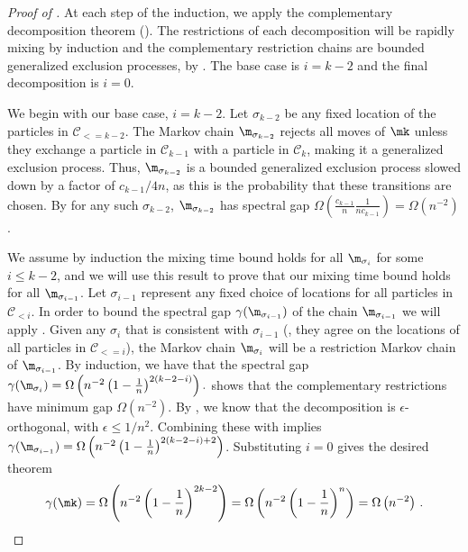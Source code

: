 \documentclass{toc}
\begin{document}
%
\begin{proof}[Proof of ]
At each step of the induction, we apply the complementary decomposition 
theorem (). The restrictions of each 
decomposition will be rapidly mixing by induction and the complementary 
restriction chains are bounded generalized exclusion processes, by 
.  The base case is $i=k-2$ and the final 
decomposition is $i=0$.
 
We begin with our base case, $i=k-2$.  
Let $\sigma_{k-2}$ be any fixed location of the particles in $\mathcal{C}_{<= k-2}.$ 
The Markov chain $\m_{\sigma_{k-2}}$ rejects all moves of $\mk$ unless 
they exchange a particle in $\mathcal{C}_{k-1}$ with a particle in 
$\mathcal{C}_{k}$,
making it a generalized exclusion process. Thus, 
$\m_{\sigma_{k-2}}$ is a bounded generalized exclusion process slowed 
down by a factor of $c_{k-1}/4n$, as this is the probability that 
these transitions are chosen.  By  for any 
such $\sigma_{k-2}$, $\m_{\sigma_{k-2}}$ has spectral gap 
$\Omega(\frac{c_{k-1}}{n}\frac{1}{n c_{k-1}})=\Omega(n^{-2})$. 

We assume by induction the mixing time bound holds for all 
$\m_{\sigma_i}$ for some $i\leq k-2$, and we will use this result to 
prove that our mixing time bound holds for all $\m_{\sigma_{i-1}}$. Let 
$\sigma_{i-1}$ represent any fixed choice of locations for all 
particles in $\mathcal{C}_{< i}$.  In order to bound the spectral gap 
$\gamma( \m_{\sigma_{i-1}})$ of the chain $\m_{\sigma_{i-1}}$ we will 
apply .  Given any $\sigma_i$ that is 
consistent with $\sigma_{i-1}$ (\ie,  they agree on the locations of all 
particles in $\mathcal{C}_{<= i}$), the Markov chain $\m_{\sigma_i}$ 
will be a restriction Markov chain of $\m_{\sigma_{i-1}}$.  By 
induction, we have that the spectral gap $\gamma(\m_{\sigma_i})= 
\Omega\left(n^{-2}\left(1-\frac{1}{n}\right)^{2(k-2-i)}\right).$ 
 shows that the complementary restrictions have 
minimum gap $\Omega(n^{-2}).$ By , we know that 
the decomposition is %
$\epsilon$-orthogonal, with $\epsilon\leq 1/n^2$. %
Combining these with 
 implies $\gamma(\m_{\sigma_{i-1}})= 
\Omega\left(n^{-2}\left(1-\frac{1}{n}\right)^{2(k-2-i)+2}\right)$. 
Substituting $i = 0$ gives the desired theorem
%
\[
\gamma(\mk) = 
\Omega\left(n^{-2}\left(1-\frac{1}{n}\right)^{2k-2}\right) = 
\Omega\left(n^{-2}\left(1-\frac{1}{n}\right)^{n}\right) = 
\Omega\left(n^{-2}\right)\,.\qedhere
%
\]
\end{proof}
%
\end{document}
